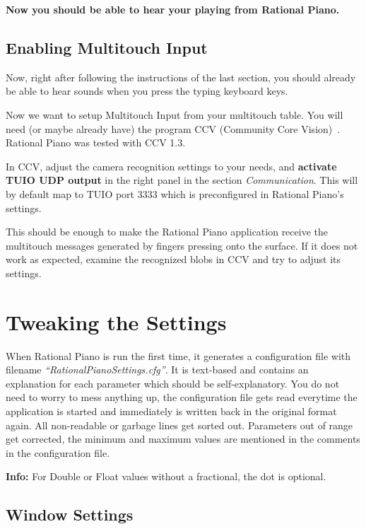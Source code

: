 \documentclass[12pt,a4paper,titlepage,oneside]{report}
\begin{document}
\textbf{Now you should be able to hear your playing from Rational Piano.}


\section{Enabling Multitouch Input}
\label{sec:input}

Now, right after following the instructions of the last section, you should already be able to hear sounds when you press the typing keyboard keys.

Now we want to setup Multitouch Input from your multitouch table. You will need (or maybe already have) the program CCV (Community Core Vision)~\cite{bib:ccv}. Rational Piano was tested with CCV 1.3.

In CCV, adjust the camera recognition settings to your needs, and \textbf{activate TUIO UDP output} in the right panel in the section \emph{Communication}. This will by default map to TUIO port 3333 which is preconfigured in Rational Piano's settings.

This should be enough to make the Rational Piano application receive the multitouch messages generated by fingers pressing onto the surface. If it does not work as expected, examine the recognized blobs in CCV and try to adjust its settings.


\chapter{Tweaking the Settings}
\label{chap:settings}

When Rational Piano is run the first time, it generates a configuration file with filename \emph{``RationalPianoSettings.cfg''}. It is text-based and contains an explanation for each parameter which should be self-explanatory. You do not need to worry to mess anything up, the configuration file gets read everytime the application is started and immediately is written back in the original format again. All non-readable or garbage lines get sorted out. Parameters out of range get corrected, the minimum and maximum values are mentioned in the comments in the configuration file.

\textbf{Info:} For Double or Float values without a fractional, the dot is optional.

\section{Window Settings}
\end{document}
